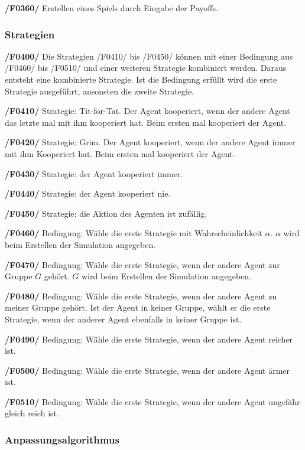 \textbf{/F0360/} 
Erstellen eines Spiels durch Eingabe der Payoffs.

\subsubsection{Strategien}

\textbf{/F0400/}
Die Strategien /F0410/ bis /F0450/ können mit einer Bedingung aus /F0460/ bis /F0510/ und einer weiteren Strategie kombiniert werden. Daraus entsteht eine kombinierte Strategie. Ist die Bedingung erfüllt wird die erste Strategie ausgeführt, ansonsten die zweite Strategie.  

\textbf{/F0410/} 
Strategie: Tit-for-Tat. Der Agent kooperiert, wenn der andere Agent das letzte mal mit ihm kooperiert hat. Beim ersten mal kooperiert der Agent.

\textbf{/F0420/} 
Strategie: Grim. Der Agent kooperiert, wenn der andere Agent immer mit ihm Kooperiert hat. Beim ersten mal kooperiert der Agent.

\textbf{/F0430/} 
Strategie: der Agent kooperiert immer.

\textbf{/F0440/}
Strategie: der Agent kooperiert nie.

\textbf{/F0450/}
Strategie: die Aktion des Agenten ist zufällig.

\textbf{/F0460/}
Bedingung: Wähle die erste Strategie mit Wahrscheinlichkeit $\alpha$. $\alpha$ wird beim Erstellen der Simulation angegeben.

\textbf{/F0470/}
Bedingung: Wähle die erste Strategie, wenn der andere Agent zur Gruppe $G$ gehört. $G$ wird beim Erstellen der Simulation angegeben.

\textbf{/F0480/}
Bedingung: Wähle die erste Strategie, wenn der andere Agent zu meiner Gruppe gehört. Ist der Agent in keiner Gruppe, wählt er die erste Strategie, wenn der anderer Agent ebenfalls in keiner Gruppe ist.

\textbf{/F0490/}
Bedingung: Wähle die erste Strategie, wenn der andere Agent reicher ist.

\textbf{/F0500/}
Bedingung: Wähle die erste Strategie, wenn der andere Agent ärmer ist.

\textbf{/F0510/}
Bedingung: Wähle die erste Strategie, wenn der andere Agent ungefähr gleich reich ist.

\subsubsection{Anpassungsalgorithmus}

